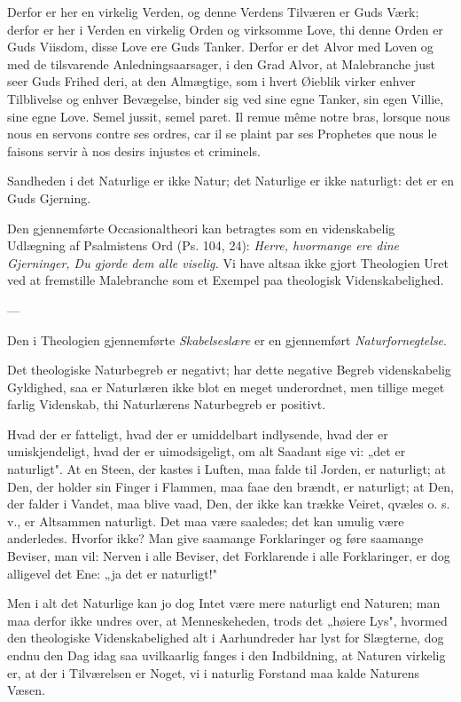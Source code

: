 \documentclass[12pt,a4paper]{article}
\newcommand{\opage}[1]{\marginnote{\footnotesize\textit{[#1]}}}
\begin{document}
Derfor er her en virkelig Verden, og denne Verdens Tilværen er Guds Værk; derfor
er her i Verden en virkelig Orden og virksomme Love, thi denne Orden er Guds
Viisdom, disse Love ere Guds Tanker. Derfor er det Alvor med Loven og med de
tilsvarende Anledningsaarsager, i den Grad Alvor, at Malebranche just seer Guds
Frihed deri, at den Almægtige, som i hvert Øieblik virker enhver Tilblivelse og
enhver Bevægelse, binder sig ved sine egne Tanker, sin egen Villie, sine egne
Love. Semel jussit, semel paret. Il remue même notre bras, lorsque nous nous en
servons contre ses ordres, car il se plaint par ses Prophetes que nous le faisons
servir à nos desirs injustes et criminels.

Sandheden i det Naturlige er ikke Natur; det Naturlige er ikke naturligt: det er
en Guds Gjerning.

Den gjennemførte Occasionaltheori kan betragtes som en videnskabelig Udlægning af
Psalmistens Ord (Ps. 104, 24): \emph{Herre, hvormange ere dine Gjerninger, Du
gjorde dem alle viselig.}
\opage{30} Vi have altsaa ikke gjort Theologien Uret ved at fremstille Malebranche som et
Exempel paa theologisk Videnskabelighed.

\begin{center}---\end{center}

Den i Theologien gjennemførte \emph{Skabelseslære} er en gjennemført
\emph{Naturfornegtelse}.

Det theologiske Naturbegreb er negativt; har dette negative Begreb videnskabelig
Gyldighed, saa er Naturlæren ikke blot en meget underordnet, men tillige meget
farlig Videnskab, thi Naturlærens Naturbegreb er positivt.

Hvad der er fatteligt, hvad der er umiddelbart indlysende, hvad der er
umiskjendeligt, hvad der er uimodsigeligt, om alt Saadant sige vi: „det er
naturligt". At en Steen, der kastes i Luften, maa falde til Jorden, er naturligt;
at Den, der holder sin Finger i Flammen, maa faae den brændt, er naturligt; at
Den, der falder i Vandet, maa blive vaad, Den, der ikke kan trække Veiret, qvæles
o. s. v., er Altsammen naturligt. Det maa være saaledes; det kan umulig være
anderledes. Hvorfor ikke? Man give saamange Forklaringer og føre saamange
Beviser, man vil: Nerven i alle Beviser, det Forklarende i alle Forklaringer, er
dog alligevel det Ene: „ja det er naturligt!"

Men i alt det Naturlige kan jo dog Intet være mere naturligt end Naturen; man maa
derfor ikke undres over, at Menneskeheden, trods det „høiere Lys", hvormed den
theologiske Videnskabelighed alt i Aarhundreder har lyst for Slægterne, dog endnu
den Dag idag saa uvilkaarlig fanges i den Indbildning, at Naturen virkelig er, at
der i Tilværelsen er Noget, vi i naturlig Forstand maa kalde Naturens Væsen.
\end{document}
